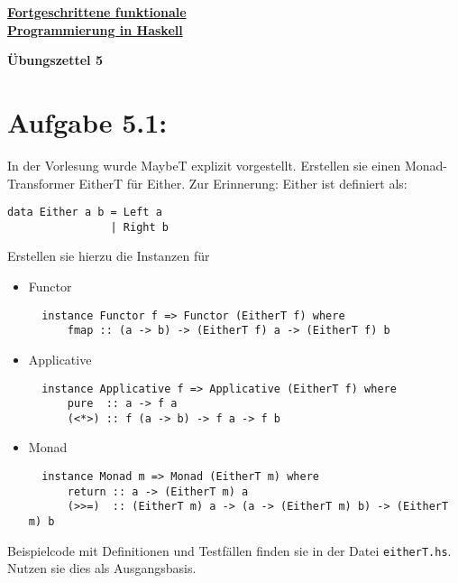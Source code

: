 \documentclass[a4paper,10pt]{scrartcl}
\newcommand{\underfat}[1]{\underline{\textbf{#1}}}
\newcommand{\theuebungszettel}{5}
\begin{document}
\begin{center}
  \begin{huge}
    \underfat{Fortgeschrittene funktionale}\\
    \underfat{Programmierung in Haskell}\\
  \end{huge}
\begin{LARGE}
\textbf{Übungszettel \theuebungszettel}
\end{LARGE}
\end{center}
\section*{Aufgabe \theuebungszettel.1:}
In der Vorlesung wurde MaybeT explizit vorgestellt. Erstellen sie einen Monad-Transformer EitherT für Either. Zur Erinnerung: Either ist definiert als:
\begin{verbatim}
data Either a b = Left a
                | Right b
\end{verbatim}
Erstellen sie hierzu die Instanzen für
\begin{itemize}
 \item Functor
       \begin{verbatim}
  instance Functor f => Functor (EitherT f) where
      fmap :: (a -> b) -> (EitherT f) a -> (EitherT f) b
       \end{verbatim}
 \item Applicative
       \begin{verbatim}
  instance Applicative f => Applicative (EitherT f) where
      pure  :: a -> f a
      (<*>) :: f (a -> b) -> f a -> f b
       \end{verbatim}
 \item Monad
       \begin{verbatim}
  instance Monad m => Monad (EitherT m) where
      return :: a -> (EitherT m) a
      (>>=)  :: (EitherT m) a -> (a -> (EitherT m) b) -> (EitherT m) b
       \end{verbatim}
\end{itemize}
Beispielcode mit Definitionen und Testfällen finden sie in der Datei \texttt{eitherT.hs}. Nutzen sie dies als Ausgangsbasis.
\end{document}
